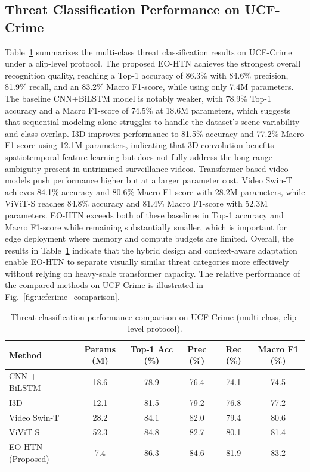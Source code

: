 \documentclass[AMA,Times1COL]{WileyNJDv5} %
\begin{document}
\subsection{Threat Classification Performance on UCF-Crime}
Table~\ref{tab:ucfcrime_perf} summarizes the multi-class threat classification results on UCF-Crime under a clip-level protocol. The proposed EO-HTN achieves the strongest overall recognition quality, reaching a Top-1 accuracy of 86.3\% with 84.6\% precision, 81.9\% recall, and an 83.2\% Macro F1-score, while using only 7.4M parameters. The baseline CNN+BiLSTM model is notably weaker, with 78.9\% Top-1 accuracy and a Macro F1-score of 74.5\% at 18.6M parameters, which suggests that sequential modeling alone struggles to handle the dataset's scene variability and class overlap. I3D improves performance to 81.5\% accuracy and 77.2\% Macro F1-score using 12.1M parameters, indicating that 3D convolution benefits spatiotemporal feature learning but does not fully address the long-range ambiguity present in untrimmed surveillance videos. Transformer-based video models push performance higher but at a larger parameter cost. Video Swin-T achieves 84.1\% accuracy and 80.6\% Macro F1-score with 28.2M parameters, while ViViT-S reaches 84.8\% accuracy and 81.4\% Macro F1-score with 52.3M parameters. EO-HTN exceeds both of these baselines in Top-1 accuracy and Macro F1-score while remaining substantially smaller, which is important for edge deployment where memory and compute budgets are limited. Overall, the results in Table~\ref{tab:ucfcrime_perf} indicate that the hybrid design and context-aware adaptation enable EO-HTN to separate visually similar threat categories more effectively without relying on heavy-scale transformer capacity. The relative performance of the compared methods on UCF-Crime is illustrated in Fig.~\ref{fig:ucfcrime_comparison}.


\begin{table}[t]
\centering
\caption{Threat classification performance comparison on UCF-Crime (multi-class, clip-level protocol).}
\label{tab:ucfcrime_perf}
\renewcommand{\arraystretch}{1.1}
\setlength{\tabcolsep}{3.5pt}
\begin{tabular}{|p{3.6cm}|c|c|c|c|c|}
\hline
\textbf{Method} & \textbf{Params (M)} & \textbf{Top-1 Acc (\%)} & \textbf{Prec (\%)} & \textbf{Rec (\%)} & \textbf{Macro F1 (\%)} \\
\hline
CNN + BiLSTM & 18.6 & 78.9 & 76.4 & 74.1 & 74.5 \\
\hline
I3D & 12.1 & 81.5 & 79.2 & 76.8 & 77.2 \\
\hline
Video Swin-T & 28.2 & 84.1 & 82.0 & 79.4 & 80.6 \\
\hline
ViViT-S & 52.3 & 84.8 & 82.7 & 80.1 & 81.4 \\
\hline
EO-HTN (Proposed) & 7.4 & 86.3 & 84.6 & 81.9 & 83.2 \\
\hline
\end{tabular}%
\end{table}
\end{document}
